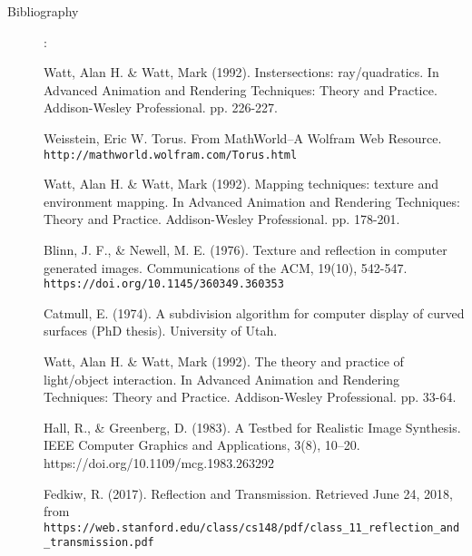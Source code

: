 \documentclass {article}
\begin{document}
\begin{description}
\item[Bibliography]:

\begingroup
\renewcommand{\section}[2]{}%
\begin{thebibliography}{15}



Watt, Alan H. \& Watt, Mark (1992). Instersections: ray/quadratics. In Advanced Animation and Rendering Techniques: Theory and Practice. Addison-Wesley Professional. pp. 226-227.

Weisstein, Eric W. Torus. From MathWorld--A Wolfram Web Resource.\\ \texttt{http://mathworld.wolfram.com/Torus.html}

Watt, Alan H. \& Watt, Mark (1992). Mapping techniques: texture and environment mapping. In Advanced Animation and Rendering Techniques: Theory and Practice. Addison-Wesley Professional. pp. 178-201.

Blinn, J. F., \& Newell, M. E. (1976). Texture and reflection in computer generated images. Communications of the ACM, 19(10), 542-547. \texttt{https://doi.org/10.1145/360349.360353}

Catmull, E. (1974). A subdivision algorithm for computer display of curved surfaces (PhD thesis). University of Utah.

Watt, Alan H. \& Watt, Mark (1992). The theory and practice of light/object interaction. In Advanced Animation and Rendering Techniques: Theory and Practice. Addison-Wesley Professional. pp. 33-64.

Hall, R., \& Greenberg, D. (1983). A Testbed for Realistic Image Synthesis. IEEE Computer Graphics and Applications, 3(8), 10–20. https://doi.org/10.1109/mcg.1983.263292

Fedkiw, R. (2017). Reflection and Transmission. Retrieved June 24, 2018, from\\
\texttt{https://web.stanford.edu/class/cs148/pdf/class\_11\_reflection\_and\_transmission.pdf}


\end{thebibliography}
\end{description}
\end{document}
